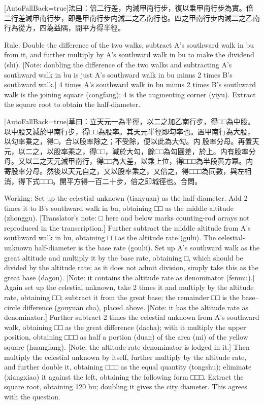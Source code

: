 \documentclass[11pt]{article}
\newcommand{\zhsmall}{\footnotesize\color{black!70}}
\newcommand{\unitlabel}[1]{\marginpar{\raggedleft\tiny\color{gray}#1}}
\newenvironment{unitzh}{\par\CJKfontspec{Noto Serif CJK SC}[AutoFallBack=true]\large\linespread{1.25}\selectfont}{\par}
\newenvironment{uniten}{\par\small\color{black!85}}{\par\medskip}
\begin{document}
\begin{unitzh}\unitlabel{ceyuan-014.6}法曰：倍二行差，内減甲南行步，復以乗甲南行步為實。{\zhsmall 倍二行差減甲南行步，即是甲南行步内減二之乙南行也。}四之甲南行步内減二之乙南行為從方，四為益隅，開平方得半徑。\end{unitzh}
\begin{uniten}Rule: Double the difference of the two walks, subtract A's southward walk in bu from it, and further multiply by A's southward walk in bu to make the dividend (shi). [Note: doubling the difference of the two walks and subtracting A's southward walk in bu is just A's southward walk in bu minus 2 times B's southward walk.] 4 times A's southward walk in bu minus 2 times B's southward walk is the joining square (congfang); 4 is the augmenting corner (yiyu). Extract the square root to obtain the half-diameter.\end{uniten}

\begin{unitzh}\unitlabel{ceyuan-014.7}草曰：立天元一為半徑，以二之加乙南行步，得□□為中股。以中股又減於甲南行步，得□□為股率。其天元半徑即勾率也。置甲南行為大股，以勾率乗之，得□，合以股率除之；不受除，便以此為大勾。{\zhsmall 内𢃄股率分母。}再置天元，以二之，以股率乘之，得□□，減於大勾，餘□□為勾圓差，於上。{\zhsmall 内有股率分母。}又以二之天元減甲南行，得□□為大差，以乘上位，得□□□為半段黄方冪。{\zhsmall 内寄股率分母。}然後以天元自之，又以股率乘之，又倍之，得□□□為同數，與左相消，得下式□□□。開平方得一百二十步，倍之即城徑也。合問。\end{unitzh}
\begin{uniten}Working: Set up the celestial unknown (tianyuan) as the half-diameter. Add 2 times it to B's southward walk in bu, obtaining □□ as the middle altitude (zhonggu). [Translator's note: □ here and below marks counting-rod arrays not reproduced in the transcription.] Further subtract the middle altitude from A's southward walk in bu, obtaining □□ as the altitude rate (gulü). The celestial-unknown half-diameter is the base rate (goulü). Set up A's southward walk as the great altitude and multiply it by the base rate, obtaining □, which should be divided by the altitude rate; as it does not admit division, simply take this as the great base (dagou). [Note: it contains the altitude rate as denominator (fenmu).] Again set up the celestial unknown, take 2 times it and multiply by the altitude rate, obtaining □□; subtract it from the great base; the remainder □□ is the base–circle difference (gouyuan cha), placed above. [Note: it has the altitude rate as denominator.] Further subtract 2 times the celestial unknown from A's southward walk, obtaining □□ as the great difference (dacha); with it multiply the upper position, obtaining □□□ as half a portion (duan) of the area (mi) of the yellow square (huangfang). [Note: the altitude-rate denominator is lodged in it.] Then multiply the celestial unknown by itself, further multiply by the altitude rate, and further double it, obtaining □□□ as the equal quantity (tongshu); eliminate (xiangxiao) it against the left, obtaining the following form □□□. Extract the square root, obtaining 120 bu; doubling it gives the city diameter. This agrees with the question.\end{uniten}
\end{document}
